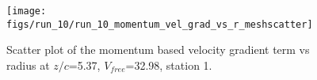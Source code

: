 \begin{figure}[H]
\centering
\texttt{[image: figs/run\_10/run\_10\_momentum\_vel\_grad\_vs\_r\_meshscatter]}
\caption{Scatter plot of the momentum based velocity gradient term vs radius at $z/c$=5.37, $V_{free}$=32.98, station 1.}
\label{fig:run_10_momentum_vel_grad_vs_r_meshscatter}
\end{figure}


